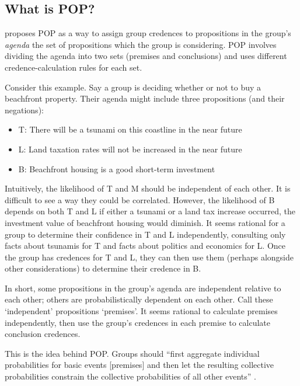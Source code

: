\documentclass{article}
\begin{document}
\subsection{What is POP?}

\citet{dietrich2013probabilistic} proposes POP as a way to assign group credences to propositions in the group's \textit{agenda} \textemdash{} the set of propositions which the group is considering. POP involves dividing the agenda into two sets (premises and conclusions) and uses different credence-calculation rules for each set. 

Consider this example. Say a group is deciding whether or not to buy a beachfront property. Their agenda might include three propositions (and their negations):

\begin{itemize}
	\item T: There will be a tsunami on this coastline in the near future
	\item L: Land taxation rates will not be increased in the near future
	\item B: Beachfront housing is a good short-term investment
\end{itemize}

\noindent
Intuitively, the likelihood of T and M should be independent of each other. It is difficult to see a way they could be correlated. However, the likelihood of B depends on both T and L \textemdash{} if either a tsunami or a land tax increase occurred, the investment value of beachfront housing would diminish. It seems rational for a group to determine their confidence in T and L independently, consulting only facts about tsunamis for T and facts about politics and economics for L. Once the group has credences for T and L, they can then use them (perhaps alongside other considerations) to determine their credence in B. 

In short, some propositions in the group's agenda are independent relative to each other; others are probabilistically dependent on each other. Call these `independent' propositions `premises'. It seems rational to calculate premises independently, then use the group's credences in each premise to calculate conclusion credences.

This is the idea behind POP. Groups should ``first aggregate individual probabilities for basic events [premises] and then let the resulting collective probabilities constrain the collective probabilities of all other events'' \citep[pg. 6]{dietrich2013probabilistic}. 
\end{document}
